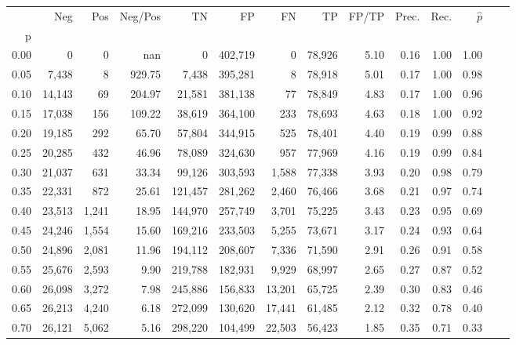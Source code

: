 \begin{tabular}{rrrrrrrrrrrrrr}
\toprule
{} &     Neg &     Pos & Neg/Pos &       TN &       FP &      FN &      TP & FP/TP & Prec. &  Rec. & $\hat{p}$ \\
p    &         &         &         &          &          &         &         &       &       &       &           \\
\midrule
0.00 &       0 &       0 &     nan &        0 &  402,719 &       0 &  78,926 &  5.10 &  0.16 &  1.00 &      1.00 \\
0.05 &   7,438 &       8 &  929.75 &    7,438 &  395,281 &       8 &  78,918 &  5.01 &  0.17 &  1.00 &      0.98 \\
0.10 &  14,143 &      69 &  204.97 &   21,581 &  381,138 &      77 &  78,849 &  4.83 &  0.17 &  1.00 &      0.96 \\
0.15 &  17,038 &     156 &  109.22 &   38,619 &  364,100 &     233 &  78,693 &  4.63 &  0.18 &  1.00 &      0.92 \\
0.20 &  19,185 &     292 &   65.70 &   57,804 &  344,915 &     525 &  78,401 &  4.40 &  0.19 &  0.99 &      0.88 \\
0.25 &  20,285 &     432 &   46.96 &   78,089 &  324,630 &     957 &  77,969 &  4.16 &  0.19 &  0.99 &      0.84 \\
0.30 &  21,037 &     631 &   33.34 &   99,126 &  303,593 &   1,588 &  77,338 &  3.93 &  0.20 &  0.98 &      0.79 \\
0.35 &  22,331 &     872 &   25.61 &  121,457 &  281,262 &   2,460 &  76,466 &  3.68 &  0.21 &  0.97 &      0.74 \\
0.40 &  23,513 &   1,241 &   18.95 &  144,970 &  257,749 &   3,701 &  75,225 &  3.43 &  0.23 &  0.95 &      0.69 \\
0.45 &  24,246 &   1,554 &   15.60 &  169,216 &  233,503 &   5,255 &  73,671 &  3.17 &  0.24 &  0.93 &      0.64 \\
0.50 &  24,896 &   2,081 &   11.96 &  194,112 &  208,607 &   7,336 &  71,590 &  2.91 &  0.26 &  0.91 &      0.58 \\
0.55 &  25,676 &   2,593 &    9.90 &  219,788 &  182,931 &   9,929 &  68,997 &  2.65 &  0.27 &  0.87 &      0.52 \\
0.60 &  26,098 &   3,272 &    7.98 &  245,886 &  156,833 &  13,201 &  65,725 &  2.39 &  0.30 &  0.83 &      0.46 \\
0.65 &  26,213 &   4,240 &    6.18 &  272,099 &  130,620 &  17,441 &  61,485 &  2.12 &  0.32 &  0.78 &      0.40 \\
0.70 &  26,121 &   5,062 &    5.16 &  298,220 &  104,499 &  22,503 &  56,423 &  1.85 &  0.35 &  0.71 &      0.33 \\

\end{tabular}

